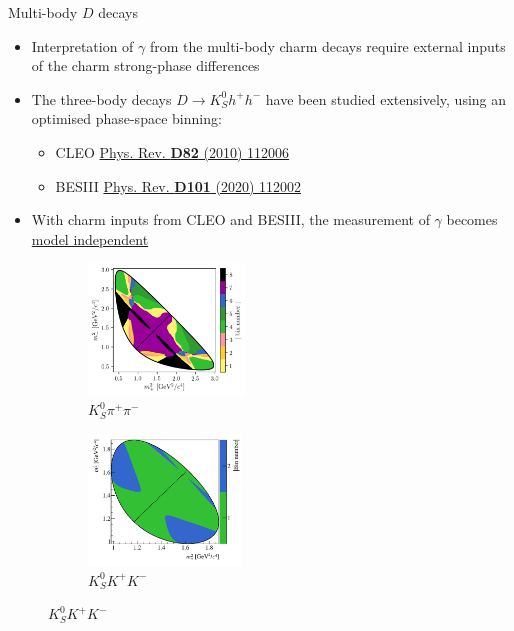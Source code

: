 \documentclass[xcolor={dvipsnames}]{beamer}
\begin{document}
\begin{frame}{Multi-body $D$ decays}
  \begin{itemize}
    \setlength\itemsep{0.5em}
    \item{Interpretation of $\gamma$ from the multi-body charm decays require external inputs of the charm strong-phase differences}
    \item{The three-body decays $D\to K_S^0h^+h^-$ have been studied extensively, using an optimised phase-space binning:}
    \begin{itemize}
      \item{CLEO \href{https://doi.org/10.1103/PhysRevD.82.112006}{Phys. Rev. \textbf{D82} (2010) 112006}}
      \item{BESIII \href{https://journals.aps.org/prd/abstract/10.1103/PhysRevD.101.112002}{Phys. Rev. \textbf{D101} (2020) 112002}}
    \end{itemize}
    \item{With charm inputs from CLEO and BESIII, the measurement of $\gamma$ becomes \underline{model independent}}
  \end{itemize}
  \begin{figure}
    \centering
    \begin{subfigure}{0.5\textwidth}
      \centering
      \includegraphics[height = 3.5cm]{Plots/KsPiPi_optimal.png}
      \vspace{-0.3cm}
      \caption*{$K_S^0\pi^+\pi^-$}
    \end{subfigure}%
    \begin{subfigure}{0.5\textwidth}
      \centering
      \includegraphics[height = 3.5cm]{Plots/KsKK_binning.png}
      \vspace{-0.3cm}
      \caption*{$K_S^0K^+K^-$}
    \end{subfigure}
  \end{figure}
\end{frame}
\end{document}
